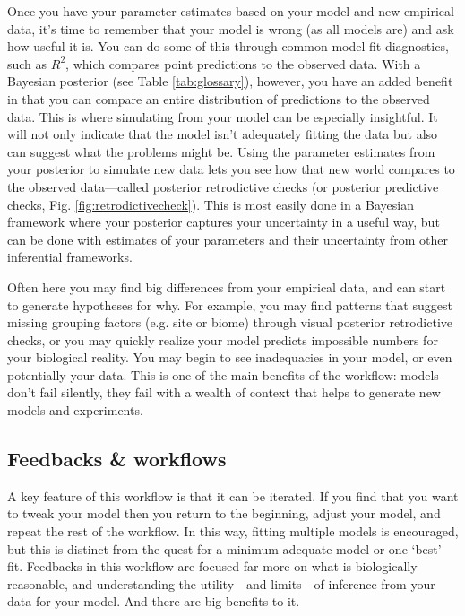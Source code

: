 \documentclass[11pt]{article}
\begin{document}
Once you have your parameter estimates based on your model and new empirical data, it's time to remember that your model is wrong (as all models are) and ask how useful it is. You can do some of this through common model-fit diagnostics, such as $R^2$, which compares point predictions to the observed data. With a Bayesian posterior (see Table \ref{tab:glossary}), however, you have an added benefit in that you can compare an entire distribution of predictions to the observed data. 
This is where simulating from your model can be especially insightful. It will not only indicate that the model isn't adequately fitting the data but also can suggest what the problems might be. Using the parameter estimates from your posterior to simulate new data \citep[][]{held2010,gelman200ppc,conn2018} lets you see how that new world compares to the observed data---called posterior retrodictive checks (or posterior predictive checks, Fig. \ref{fig:retrodictivecheck}). This is most easily done in a Bayesian framework where your posterior captures your uncertainty in a useful way, but can be done with estimates of your parameters and their uncertainty from other inferential frameworks. 

Often here you may find big differences from your empirical data, and can start to generate hypotheses for why. For example, you may find patterns that suggest missing grouping factors (e.g. site or biome) through visual posterior retrodictive checks, or you may quickly realize your model predicts impossible numbers for your biological reality. You may begin to see inadequacies in your model, or even potentially your data.  This is one of the main benefits of the workflow: models don't fail silently, they fail with a wealth of context that helps to generate new models and experiments.

\subsection*{Feedbacks \& workflows}
A key feature of this workflow is that it can be iterated.  If you find that you want to tweak your model then you return to the beginning, adjust your model, and repeat the rest of the workflow. In this way, fitting multiple models is encouraged, but this is distinct from the quest for a minimum adequate model or one `best' fit. Feedbacks in this workflow are focused far more on what is biologically reasonable, and understanding the utility---and limits---of inference from your data for your model.  And there are big benefits to it. 
\end{document}
